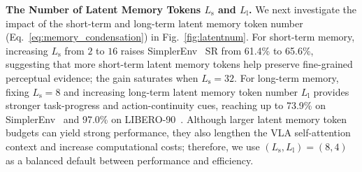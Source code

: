 
\noindent\textbf{The Number of Latent Memory Tokens $L_\text{s}$ and $L_\text{l}$.} 
We next investigate the impact of the short-term and long-term latent memory token number (Eq.~\ref{eq:memory_condensation}) in Fig.~\ref{fig:latentnum}.
For short-term memory, increasing $L_\text{s}$ from $2$ to $16$ raises SimplerEnv~\cite{li2025evaluating} SR from 61.4\% to 65.6\%, suggesting that more short-term latent memory tokens help preserve fine-grained perceptual evidence; the gain saturates when $L_\text{s}=32$.
For long-term memory, fixing $L_\text{s}=8$ and increasing long-term latent memory token number $L_\text{l}$ provides stronger task-progress and action-continuity cues, reaching up to 73.9\% on SimplerEnv~\cite{li2025evaluating} and 97.0\% on LIBERO-90~\cite{liu2023libero}.
Although larger latent memory token budgets can yield strong performance, they also lengthen the VLA self-attention context and increase computational costs; therefore, we use $(L_\text{s},L_\text{l})=(8,4)$ as a balanced default between performance and efficiency.


% 












